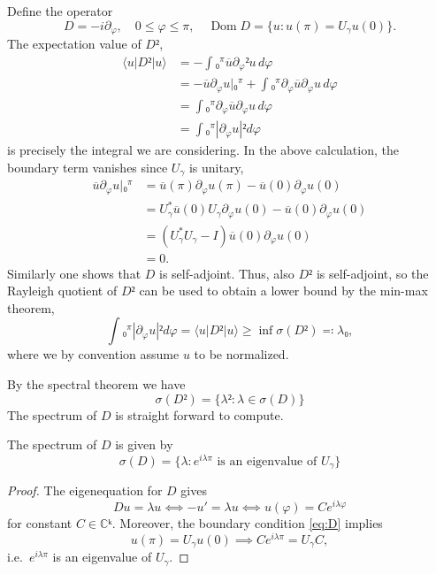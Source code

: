 Define the operator
\begin{equation}\label{eq:D}
  D = -i∂_φ, \quad 0≤φ≤π, \quad \operatorname{Dom}D = \{u : u(π) = U_γu(0)\}.
\end{equation}
The expectation value of $D²$,
\begin{equation}
  \begin{aligned}
    ⟨u|D²|u⟩
    &= -∫₀^π \overline{u} ∂_φ² u \,dφ \\
    &= -\overline{u}∂_φu\Big|₀^π + ∫₀^π ∂_φ\overline{u} ∂_φ u \,dφ \\
    &= ∫₀^π ∂_φ\overline{u} ∂_φ u \,dφ \\
    &= ∫₀^π |∂_φu|² dφ
  \end{aligned}
\end{equation}
is precisely the integral we are considering. In the above calculation, the boundary term vanishes since $U_γ$ is unitary,
\begin{equation}
  \begin{aligned}
    \overline{u}∂_φu\Big|₀^π
    &= \overline{u}(π)∂_φu(π) - \overline{u}(0)∂_φu(0) \\
    &= U_γ^*\overline{u}(0)U_γ∂_φu(0) - \overline{u}(0)∂_φu(0) \\
    &= (U_γ^*U_γ - I)\overline{u}(0)∂_φu(0) \\
    &= 0.
  \end{aligned}
\end{equation}
Similarly one shows that $D$ is self-adjoint. Thus, also $D²$ is self-adjoint, so the Rayleigh quotient of $D²$ can be used to obtain a lower bound by the min-max theorem,
\begin{equation}
  ∫₀^π |∂_φu|² dφ = ⟨u|D²|u⟩ ≥ \inf σ(D²) ≕ λ₀,
\end{equation}
where we by convention assume $u$ to be normalized.

By the spectral theorem we have
\begin{equation}
  σ(D²) = \{λ² : λ ∈ σ(D)\}
\end{equation}
The spectrum of $D$ is straight forward to compute.

\begin{lemma}
  The spectrum of $D$ is given by
  \begin{equation}
    σ(D) = \{ λ : e^{iλπ} \text{ is an eigenvalue of $U_γ$} \}
  \end{equation}
\end{lemma}
\begin{proof}
  The eigenequation for $D$ gives
  \begin{equation}
    Du = λu ⟺ -u' = λu ⟺ u(φ) = C e^{iλφ}
  \end{equation}
  for constant $C ∈ ℂᵏ$. Moreover, the boundary condition \cref{eq:D} implies
  \begin{equation}
    u(π) = U_γ u(0) ⟹ Ce^{iλπ} = U_γC,
  \end{equation}
  i.e.\ $e^{iλπ}$ is an eigenvalue of $U_γ$.
\end{proof}

